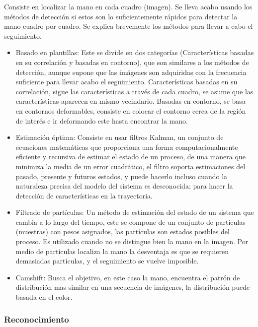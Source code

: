 Consiste en localizar la mano en cada cuadro (imagen). Se lleva acabo usando los métodos de detección si estos son lo suficientemente rápidos para detectar la mano cuadro por cuadro. Se explica brevemente los métodos para llevar a cabo el seguimiento. 
\begin{itemize}
	\item Basado en plantillas: Este se divide en dos categorías (Características basadas en su correlación y basadas en contorno), que son similares a los métodos de detección, aunque supone que las imágenes son adquiridas con la frecuencia suficiente para llevar acabo el seguimiento. Características basadas en su correlación, sigue las características a través de cada cuadro, se asume que las características aparecen en mismo vecindario. Basadas en contorno, se basa en contornos deformables, consiste en colocar el contorno cerca de la región de interés e ir deformando este hasta encontrar la mano. 
	\item Estimación óptima: Consiste en usar filtros Kalman, un conjunto de ecuaciones matemáticas que proporciona una forma  computacionalmente eficiente y recursiva de estimar el estado de un proceso, de una manera que minimiza la media de un error cuadrático, el filtro soporta estimaciones del pasado, presente y futuros estados, y puede hacerlo incluso cuando la naturaleza precisa del modelo del sistema es desconocida;  para hacer la detección de características en la trayectoria. 
	\item Filtrado de partículas: Un método de estimación del estado de un sistema que cambia a lo largo del tiempo, este se compone de un conjunto de partículas (muestras) con pesos asignados, las partículas son estados posibles del proceso. Es utilizado cuando no se distingue bien la mano en la imagen. Por medio de partículas localiza la mano la desventaja es que se requieren demasiadas partículas, y el seguimiento se vuelve imposible. 
	\item Camshift: Busca el objetivo, en este caso la mano, encuentra el patrón de distribución mas similar en una secuencia de imágenes, la distribución puede basada en el color. 
\end{itemize}

\subsubsection{Reconocimiento}\label{sssec:EtapaReconocimiento}

